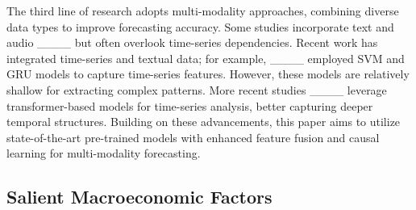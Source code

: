 The third line of research adopts multi-modality approaches, combining diverse data types to improve forecasting accuracy. Some studies incorporate text and audio ____ but often overlook time-series dependencies. Recent work has integrated time-series and textual data; for example, ____ employed SVM and GRU models to capture time-series features. However, these models are relatively shallow for extracting complex patterns. More recent studies ____ leverage transformer-based models for time-series analysis, better capturing deeper temporal structures. Building on these advancements, this paper aims to utilize state-of-the-art pre-trained models with enhanced feature fusion and causal learning for multi-modality forecasting.


\subsection{Salient Macroeconomic Factors}

